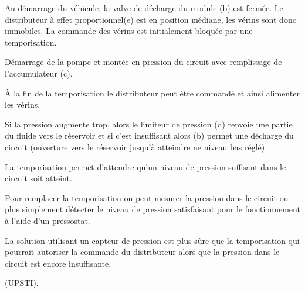 \fi

Au démarrage du véhicule, la valve de décharge du module (b) est fermée. Le distributeur à effet proportionnel(e) est en position médiane, les vérins sont donc immobiles. La commande des vérins est initialement bloquée par une temporisation.

\ifprof
\begin{corrige}
Démarrage de la pompe et montée en pression du circuit avec remplissage de l’accumulateur (c).

À la fin de la temporisation le distributeur peut être commandé et ainsi alimenter les vérins.

Si la pression augmente trop, alors le limiteur de pression (d) renvoie une partie du fluide vers le
réservoir et si c’est insuffisant alors (b) permet une décharge du circuit (ouverture vers le réservoir
jusqu’à atteindre ne niveau bas réglé).

La temporisation permet d’attendre qu’un niveau de pression suffisant dans le circuit soit atteint.

Pour remplacer la temporisation on peut mesurer la pression dans le circuit ou plus simplement détecter
le niveau de pression satisfaisant pour le fonctionnement à l’aide d’un pressostat.

La solution utilisant un capteur de pression est plus sûre que la temporisation qui pourrait autoriser la
commande du distributeur alors que la pression dans le circuit est encore insuffisante.

(UPSTI). 
\end{corrige}
\else
\fi






\ifprof
\else


\fi

